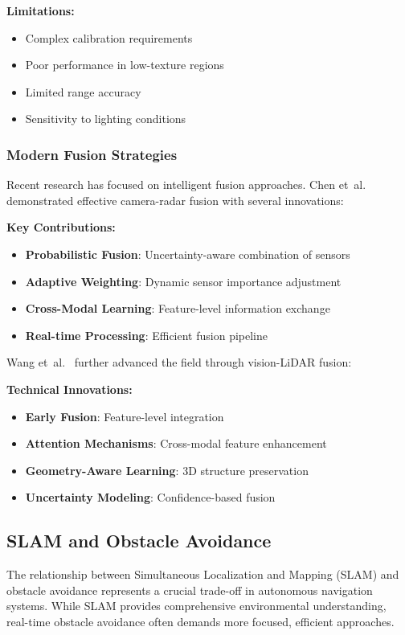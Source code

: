 \documentclass[12pt,oneside]{book}
\begin{document}
\textbf{Limitations:}
\begin{itemize}
    \item Complex calibration requirements
    \item Poor performance in low-texture regions
    \item Limited range accuracy
    \item Sensitivity to lighting conditions
\end{itemize}

\subsubsection{Modern Fusion Strategies}
Recent research has focused on intelligent fusion approaches. Chen et~al.~\cite{chen2020multi} demonstrated effective camera-radar fusion with several innovations:

\textbf{Key Contributions:}
\begin{itemize}
    \item \textbf{Probabilistic Fusion}: Uncertainty-aware combination of sensors
    \item \textbf{Adaptive Weighting}: Dynamic sensor importance adjustment
    \item \textbf{Cross-Modal Learning}: Feature-level information exchange
    \item \textbf{Real-time Processing}: Efficient fusion pipeline
\end{itemize}

Wang et~al.~\cite{wang2021multi} further advanced the field through vision-LiDAR fusion:

\textbf{Technical Innovations:}
\begin{itemize}
    \item \textbf{Early Fusion}: Feature-level integration
    \item \textbf{Attention Mechanisms}: Cross-modal feature enhancement
    \item \textbf{Geometry-Aware Learning}: 3D structure preservation
    \item \textbf{Uncertainty Modeling}: Confidence-based fusion
\end{itemize}

\subsection{SLAM and Obstacle Avoidance}

The relationship between Simultaneous Localization and Mapping (SLAM) and obstacle avoidance represents a crucial trade-off in autonomous navigation systems. While SLAM provides comprehensive environmental understanding, real-time obstacle avoidance often demands more focused, efficient approaches.
\end{document}
